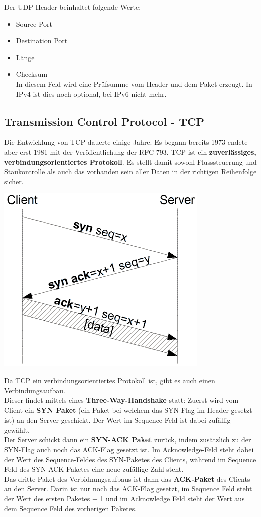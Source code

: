 \documentclass[12pt,a4paper]{report}
\begin{document}
Der UDP Header beinhaltet folgende Werte: 
\begin{itemize}
\item Source Port
\item Destination Port
\item Länge
\item Checksum\\
In diesem Feld wird eine Prüfsumme vom Header und dem Paket erzeugt. In IPv4 ist dies noch optional, bei IPv6 nicht mehr.
\end{itemize}
\subsection{Transmission Control Protocol - TCP}
Die Entwicklung von TCP dauerte einige Jahre. Es begann bereits 1973 endete aber erst 1981 mit der Veröffentlichung der RFC 793. TCP ist ein \textbf{zuverlässiges, verbindungsorientiertes Protokoll}. Es stellt damit sowohl Flusssteuerung und Staukontrolle als auch das vorhanden sein aller Daten in der richtigen Reihenfolge sicher.\\

\begin{center}
\includegraphics[scale=0.6]{../docs/tarkes/pics/TcpHandshake.png}
\end{center}

Da TCP ein verbindungsorientiertes Protokoll ist, gibt es auch einen Verbindungsaufbau.\\
Dieser findet mittels eines \textbf{Three-Way-Handshake} statt: Zuerst wird vom Client ein \textbf{SYN Paket} (ein Paket bei welchem das SYN-Flag im Header gesetzt ist) an den Server geschickt. Der Wert im Sequence-Feld ist dabei zufällig gewählt.\\
Der Server schickt dann ein \textbf{SYN-ACK Paket} zurück, indem zusätzlich zu der SYN-Flag auch noch das ACK-Flag gesetzt ist. Im Acknowledge-Feld steht dabei der Wert des Sequence-Feldes des SYN-Paketes des Clients, während im Sequence Feld des SYN-ACK Paketes eine neue zufällige Zahl steht.\\
Das dritte Paket des Verbidnungsaufbaus ist dann das \textbf{ACK-Paket} des Clients an den Server. Darin ist nur noch das ACK-Flag gesetzt, im Sequence Feld steht der Wert des ersten Paketes + 1 und im Acknowledge Feld steht der Wert aus dem Sequence Feld des vorherigen Paketes.\\
\end{document}
